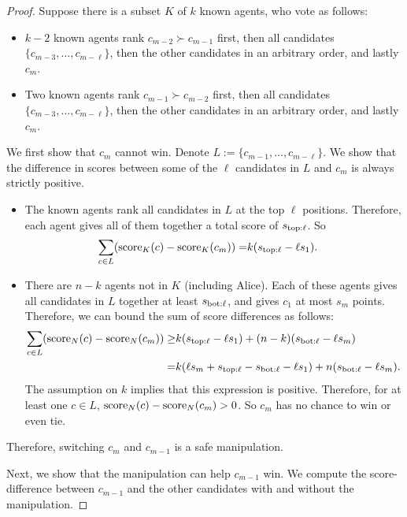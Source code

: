 \begin{proof}
Suppose there is a subset $K$ of $k$ known agents, who vote as follows:
\begin{itemize}
\item $k-2$ known agents rank $c_{m-2} \succ c_{m-1}$ first, 
then all candidates $\{c_{m-3},\ldots,c_{m-\ell}\}$,
then the other candidates in an arbitrary order,
and lastly $c_m$.
\item Two known agents rank $c_{m-1} \succ c_{m-2}$ first, 
then all candidates $\{c_{m-3},\ldots,c_{m-\ell}\}$,
then the other candidates in an arbitrary order,
and lastly $c_m$.
\end{itemize}

We first show that $c_m$ cannot win. 
Denote $L := \{c_{m-1}, \ldots, c_{m-\ell}\}$.
We show that the difference in scores between some of the $\ell$ candidates in $L$ and $c_m$ is always strictly positive.
\begin{itemize}
\item The known agents rank all candidates in $L$ at the top $\ell$ positions. Therefore, each agent gives all of them together a total score of $s_{\mathrm{top:}\ell}$. So
\begin{align*}
\sum_{c\in L} (\operatorname{score}_K(c)-\operatorname{score}_K(c_m)) =
&
k(s_{\mathrm{top:}\ell} - \ell s_1).
\end{align*}
\item There are $n-k$ agents not in $K$ (including Alice).
Each of these agents gives all candidates in $L$ together at least $s_{\mathrm{bot:}\ell}$, and gives $c_1$ at most $s_m$ points. Therefore, we can bound the sum of score differences as follows:
\begin{align*}
\sum_{c\in L} (\operatorname{score}_N(c)-\operatorname{score}_N(c_m)) \geq
&
k (s_{\mathrm{top:}\ell} - \ell s_1)
+ (n-k) (s_{\mathrm{bot:}\ell} - \ell s_m)
\\
=&
k (\ell s_m + s_{\mathrm{top:}\ell} - s_{\mathrm{bot:}\ell} - \ell s_1)
+ n(s_{\mathrm{bot:}\ell} - \ell s_m).
\end{align*}
The assumption on $k$ implies that this expression is positive. Therefore, for at least one $c\in L$, $\operatorname{score}_N(c)-\operatorname{score}_N(c_m) > 0$.
So $c_m$ has no chance to win or even tie.
\end{itemize}
Therefore, switching $c_m$ and $c_{m-1}$ is a safe manipulation.

Next, we show that the manipulation can help $c_{m-1}$ win. We compute the score-difference between $c_{m-1}$ and the other candidates with and without the manipulation. 


\end{proof}
